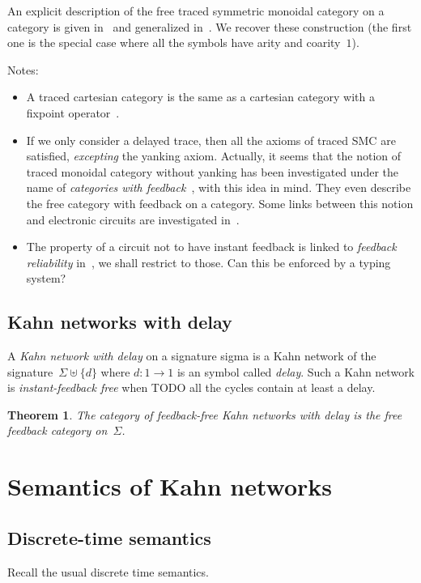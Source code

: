 \documentclass{article}
\newtheorem{theorem}{Theorem}
\begin{document}
An explicit description of the free traced symmetric monoidal category on a
category is given in~\cite{abramsky:traced-compact-closed} and generalized
in~\cite{hasegawa2008finite}. We recover these construction (the first one is
the special case where all the symbols have arity and coarity~$1$).

Notes:
\begin{itemize}
\item A traced cartesian category is the same as a cartesian category with a
  fixpoint operator~\cite{hasegawa1997recursion}.
\item If we only consider a delayed trace, then all the axioms of traced SMC are
  satisfied, \emph{excepting} the yanking axiom. Actually, it seems that the
  notion of traced monoidal category without yanking has been investigated under
  the name of \emph{categories with feedback}~\cite{katis2002feedback}, with
  this idea in mind. They even describe the free category with feedback on a
  category. Some links between this notion and electronic circuits are
  investigated in~\cite{katis1999algebra}.
\item The property of a circuit not to have instant feedback is linked to
  \emph{feedback reliability} in~\cite{pardo2004synchronous}, we shall restrict
  to those. Can this be enforced by a typing system?
\end{itemize}

\subsection{Kahn networks with delay}
A \emph{Kahn network with delay} on a signature sigma is a Kahn network of the
signature~$\Sigma\uplus\{d\}$ where $d:1\to 1$ is an symbol called
\emph{delay}. Such a Kahn network is \emph{instant-feedback free} when TODO all
the cycles contain at least a delay.

\begin{theorem}
  The category of feedback-free Kahn networks with delay is the free feedback
  category on~$\Sigma$.
\end{theorem}


\section{Semantics of Kahn networks}
\subsection{Discrete-time semantics}
Recall the usual discrete time semantics.
\end{document}
